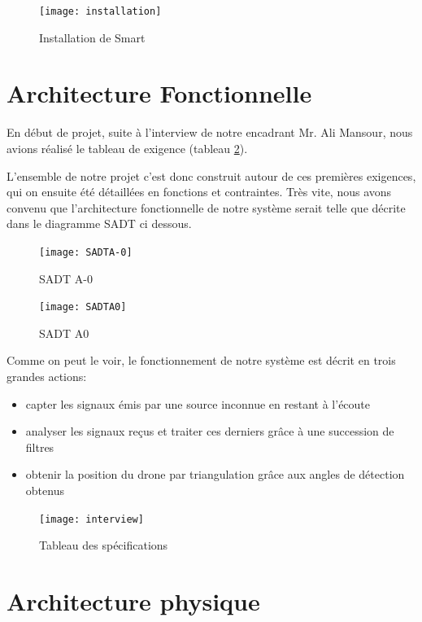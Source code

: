 \begin{figure}[!h]
  \centering
  \texttt{[image: installation]}
  \caption{Installation de Smart}
  \label{fig:inst}
\end{figure}


\section{Architecture Fonctionnelle}
En début de projet, suite à l'interview de notre encadrant Mr. Ali Mansour, nous avions réalisé le tableau de exigence (tableau \ref{pdf:tab}).


L'ensemble de notre projet c'est donc construit autour de ces premières exigences, qui on ensuite été détaillées en fonctions et contraintes. Très vite, nous avons convenu que l'architecture fonctionnelle de notre système serait telle que décrite dans le diagramme SADT ci dessous.

\begin{figure}[h]
  \begin{minipage}{0.45\linewidth}
    \centering
    \texttt{[image: SADTA-0]}
    \caption{SADT A-0}
  \end{minipage}\hfill
  \begin{minipage}{0.45\linewidth}
    \centering
    \texttt{[image: SADTA0]}
    \caption{SADT A0}
  \end{minipage}
\end{figure}




Comme on peut le voir, le fonctionnement de notre système est décrit en trois grandes actions: 
\begin{itemize}
\item capter les signaux émis par une source inconnue en restant à l'écoute
\item analyser les signaux reçus et traiter ces derniers grâce à une succession de filtres
\item obtenir la position du drone par triangulation grâce aux angles de détection obtenus
\end{itemize}


\begin{figure}[h]
  \centering
  \texttt{[image: interview]}
  \caption{Tableau des spécifications}
  \label{pdf:tab}
\end{figure}

 

\newpage


\section{Architecture physique}
\label{sec:phys}


